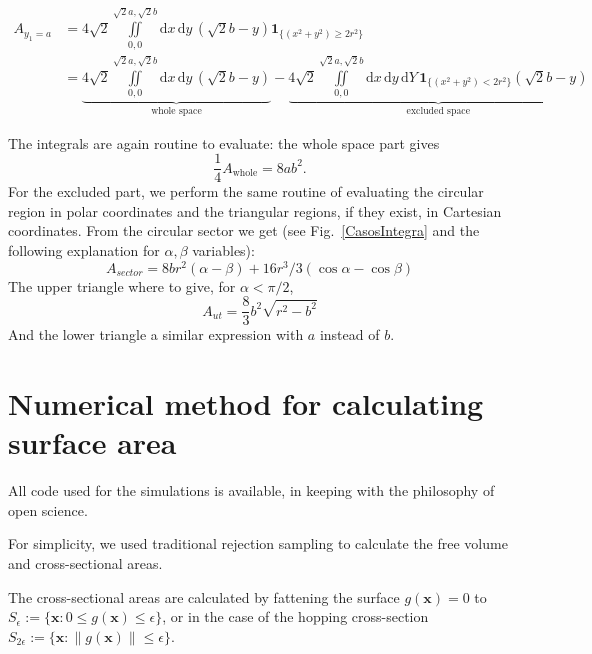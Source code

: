 \documentclass[superscriptaddress,pre,reprint,showpacs,twocolumn]{revtex4-1}
\newcommand{\rd}[1]{\mathrm{d}{#1} \,}
\newcommand{\indicatorsymbol}{\mathbf{1}}
\newcommand{\indicator}[1]{\indicatorsymbol_{ \{   #1 \} } }
\begin{document}
    \begin{widetext}
    \begin{align}
      A_{y_1=a} & =4\sqrt{2}\iint \limits_{0,0}^{\sqrt{2}a,\sqrt{2}b}
        \rd x \rd y (\sqrt{2} b - y)
        \indicator{(x^2+y^2) \geq 2 r^2}\\
     &=\underbrace{4\sqrt{2}\iint \limits _{0,0}^{\sqrt{2}a,\sqrt{2}b}
        \rd x \rd y (\sqrt{2} b - y)}_{\text{whole space}}
        -\underbrace{
          4\sqrt{2}\iint \limits_{0,0}^{\sqrt{2}a,\sqrt{2}b}
        \rd x \rd y \rd Y 
        \indicator{(x^2+y^2) < 2 r^2}(\sqrt{2} b - y)}_{\text{excluded space}}
    \end{align}
    \end{widetext}
    The integrals are again routine to evaluate: the whole space part
    gives
    \begin{equation}
      \frac{1}{4}A_{\text{whole}}=8ab^2.
    \end{equation}
    For the excluded part, we perform the same routine of evaluating the circular region
    in polar coordinates and the triangular regions, if they exist, in Cartesian coordinates.
    From the circular sector we get (see Fig.~\ref{CasosIntegra} and the following explanation
    for $\alpha, \beta$ variables):
    \begin{equation}
      A_{sector}=8 b r^2(\alpha-\beta)+16r^3/3(\cos\alpha - \cos\beta)
    \end{equation}
    The upper triangle where to give, for $\alpha < \pi/2$,
    \begin{equation}
    A_{ut}=\frac{8}{3}b^2\sqrt{r^2-b^2}
    \end{equation}
    And the lower triangle a similar expression with $a$ instead of $b$.


\section{Numerical method for calculating surface area}
    
All code used for the simulations is available, in keeping with the philosophy of open science.

For simplicity, we used traditional rejection sampling to calculate the free volume and cross-sectional areas.

The cross-sectional areas are calculated by fattening the surface $g(\mathbf{x}) = 0$ to $S_\epsilon := \{ \mathbf{x} : 0 \le g(\mathbf{x}) \le \epsilon \}$, or in the
case of the hopping cross-section $S_{2 \epsilon} := \{ \mathbf{x}: \|g(\mathbf{x}) \| \le \epsilon \}$.
\end{document}
